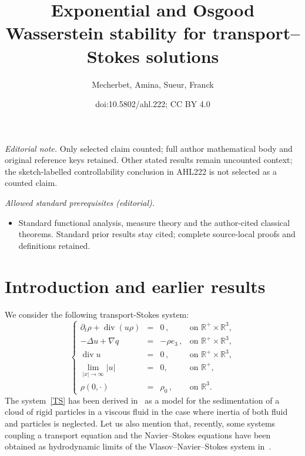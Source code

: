 \documentclass[10pt]{amsart}
\title{Exponential and Osgood Wasserstein stability for transport--Stokes solutions}
\author{Mecherbet, Amina, Sueur, Franck}
\date{doi:10.5802/ahl.222; CC BY 4.0}
\theoremstyle{definition}\newtheorem{defi}[theo]{Definition}\newtheorem{rema}[theo]{Remark}\newtheorem{exam}[theo]{Example}\newtheorem{exem}[theo]{Example}\newtheorem{nota}[theo]{Notation}
\newcommand{\R}{\mathbb{R}}
\renewcommand{\div}{\operatorname{div}}
\begin{document}
\maketitle
\noindent\textit{Editorial note.} Only selected claim counted; full author mathematical body and original reference keys retained. Other stated results remain uncounted context; the sketch-labelled controllability conclusion in AHL222 is not selected as a counted claim.\par\medskip
\noindent\textit{Allowed standard prerequisites (editorial).}\begin{itemize}
\item Standard functional analysis, measure theory and the author-cited classical theorems. Standard prior results stay cited; complete source-local proofs and definitions retained.
\end{itemize}\medskip


\section{Introduction and earlier results}

We consider the following transport-Stokes system:
\begin{equation}\label{TS}
\left\{
\begin{array}{rcll}
\partial_t \rho+{\div}(u \rho) &=& 0\,,& \text{on }\R^+ \times \R^3,\\
- \Delta u+ \nabla q &=& - \rho e_3 \,,& \text{on }\R^+ \times \R^3,\\
\div u & =&0\,,& \text{on }\R^+ \times \R^3,\\
\underset{|x|\to \infty}{\lim}|u| &=& 0,& \text{on } \R^+,\\
\rho(0,\cdot) &= & \rho_0 \,,&\text{on } \R^3.
\end{array}
\right.
\end{equation}
The system~\eqref{TS} has been derived in~\cite{Hofer, Mecherbet} as a model for the sedimentation of a cloud of rigid particles in a viscous fluid in the case where inertia of both fluid and particles is neglected. Let us also mention that, recently, some systems coupling a transport equation and the Navier--Stokes equations have been obtained as hydrodynamic limits of the Vlasov--Navier--Stokes system in~\cite{HKM}.
\end{document}
